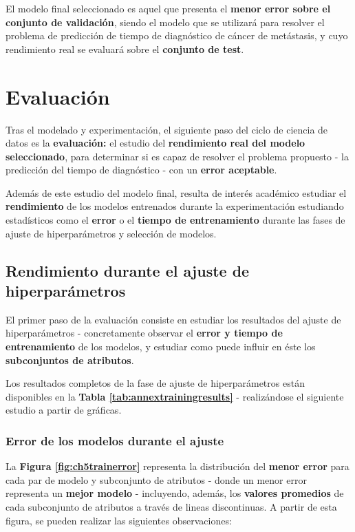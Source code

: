 El modelo final seleccionado es aquel que presenta el \textbf{menor error sobre el conjunto de validación}, siendo el modelo que se utilizará para resolver el problema de predicción de tiempo de diagnóstico de cáncer de metástasis, y cuyo rendimiento real se evaluará sobre el \textbf{conjunto de test}.

\section{Evaluación}

Tras el modelado y experimentación, el siguiente paso del ciclo de ciencia de datos es la \textbf{evaluación:} el estudio del \textbf{rendimiento real del modelo seleccionado}, para determinar si es capaz de resolver el problema propuesto - la predicción del tiempo de diagnóstico - con un \textbf{error aceptable}.

Además de este estudio del modelo final, resulta de interés académico estudiar el \textbf{rendimiento} de los modelos entrenados durante la experimentación estudiando estadísticos como el \textbf{error} o el \textbf{tiempo de entrenamiento} durante las fases de ajuste de hiperparámetros y selección de modelos.

\subsection{Rendimiento durante el ajuste de hiperparámetros}

El primer paso de la evaluación consiste en estudiar los resultados del ajuste de hiperparámetros - concretamente observar el \textbf{error y tiempo de entrenamiento} de los modelos, y estudiar como puede influir en éste los \textbf{subconjuntos de atributos}.

Los resultados completos de la fase de ajuste de hiperparámetros están disponibles en la \textbf{Tabla \ref{tab:annextrainingresults}} - realizándose el siguiente estudio a partir de gráficas.

\subsubsection{Error de los modelos durante el ajuste}

La \textbf{Figura \ref{fig:ch5trainerror}} representa la distribución del \textbf{menor error} para cada par de modelo y subconjunto de atributos - donde un menor error representa un \textbf{mejor modelo} - incluyendo, además, los \textbf{valores promedios} de cada subconjunto de atributos a través de lineas discontinuas. A partir de esta figura, se pueden realizar las siguientes observaciones:

